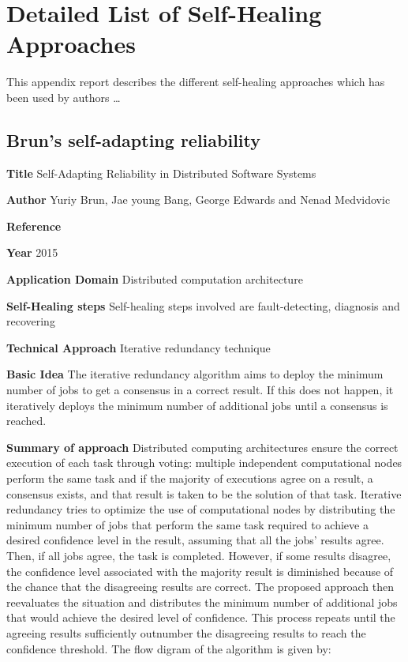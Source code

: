 \chapter{Detailed List of Self-Healing Approaches}
\label{ap:approches}
This appendix report describes the different self-healing approaches which has been used by authors  \ldots 

\section{Brun's self-adapting reliability} \label{ap:BurnSelf}
\begin{compactitem}
\item[\textbf{Title}]Self-Adapting Reliability in Distributed Software Systems
\item[\textbf{Author}] 
Yuriy Brun, Jae young Bang, George Edwards and Nenad Medvidovic
\item[\textbf{Reference}] 
\cite{brun_self-adapting_2015}
\item[\textbf{Year}] 
2015
\item[\textbf{Application Domain}] 
Distributed computation architecture
\item[\textbf{Self-Healing steps}] Self-healing steps involved are fault-detecting, diagnosis and recovering
\item[\textbf{Technical Approach}]Iterative redundancy technique
\item[\textbf{Basic Idea}] 
The iterative redundancy algorithm aims to deploy the minimum number of jobs to get a consensus in a correct result. If this does not happen, it iteratively deploys the minimum number of additional jobs until a consensus is reached. 

\item[\textbf{Summary of approach}]
Distributed computing architectures ensure the correct execution of each task through voting: multiple independent computational nodes perform the same task and if the majority of executions agree on a result, a consensus exists, and that result is taken to be the solution of that task. Iterative redundancy tries to optimize the use of computational nodes by distributing the minimum number of jobs that perform the same task required to achieve a desired confidence level in the result, assuming that all the jobs’ results agree. Then, if all jobs agree, the task is completed. However, if some results disagree, the confidence level associated with the majority result is diminished because of the chance that the disagreeing results are correct. The proposed approach then reevaluates the situation and distributes the minimum number of additional jobs that would achieve the desired level of confidence. This process repeats until the agreeing results sufficiently outnumber the disagreeing results to reach the confidence threshold. The flow digram of the algorithm is given by:


\end{compactitem}
